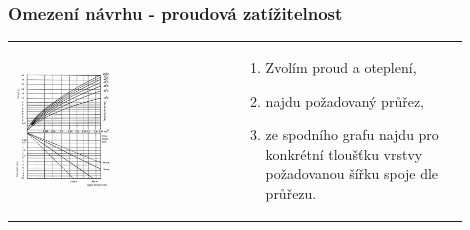 \documentclass{beamer}
\begin{document}
\begin{frame}
	\frametitle{Omezení návrhu - proudová zatížitelnost}
	
	\begin{center}
		\begin{tabular}{m{0.45\linewidth} m{0.45\linewidth}}
		 \includegraphics[width=0.45\textwidth]{track-width.png} &
			
			\begin{enumerate}
				\item Zvolím proud a oteplení,
				\item najdu požadovaný průřez,
				\item ze spodního grafu najdu pro konkrétní tloušťku vrstvy požadovanou šířku spoje dle průřezu.
			\end{enumerate}
		\end{tabular}
	\end{center}
	
\end{frame}
\end{document}
